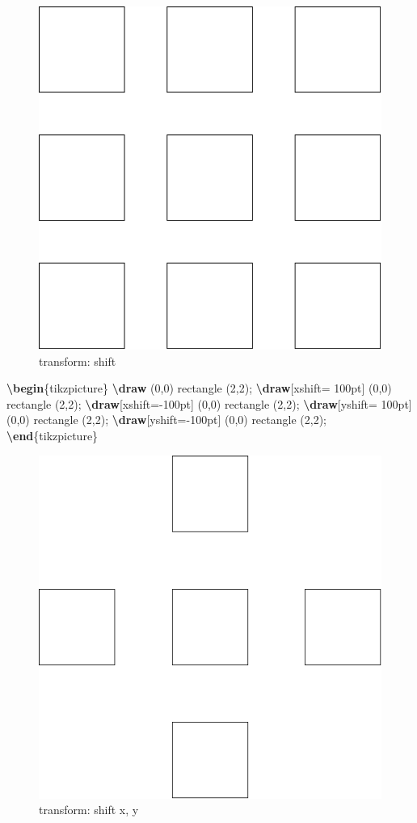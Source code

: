 \documentclass[
]{book}
\newenvironment{Shaded}{\begin{snugshade}}{\end{snugshade}}
\newcommand{\ExtensionTok}[1]{#1}
\newcommand{\FunctionTok}[1]{\textcolor[rgb]{0.13,0.29,0.53}{\textbf{#1}}}
\newcommand{\KeywordTok}[1]{\textcolor[rgb]{0.13,0.29,0.53}{\textbf{#1}}}
\newcommand{\NormalTok}[1]{#1}
\theoremstyle{definition}
\theoremstyle{definition}
\theoremstyle{definition}
\theoremstyle{definition}
\theoremstyle{remark}
\begin{document}
\begin{figure}
\includegraphics[width=0.75\linewidth]{202401311000-TikZ_files/figure-latex/unnamed-chunk-43-1} \caption{transform: shift}\label{fig:unnamed-chunk-43}
\end{figure}

\begin{Shaded}
\begin{Highlighting}[]
\KeywordTok{\textbackslash{}begin}\NormalTok{\{}\ExtensionTok{tikzpicture}\NormalTok{\}}
  \FunctionTok{\textbackslash{}draw}\NormalTok{ (0,0) rectangle (2,2);}
  \FunctionTok{\textbackslash{}draw}\NormalTok{[xshift= 100pt] (0,0) rectangle (2,2);}
  \FunctionTok{\textbackslash{}draw}\NormalTok{[xshift={-}100pt] (0,0) rectangle (2,2);}
  \FunctionTok{\textbackslash{}draw}\NormalTok{[yshift= 100pt] (0,0) rectangle (2,2);}
  \FunctionTok{\textbackslash{}draw}\NormalTok{[yshift={-}100pt] (0,0) rectangle (2,2);}
\KeywordTok{\textbackslash{}end}\NormalTok{\{}\ExtensionTok{tikzpicture}\NormalTok{\}}
\end{Highlighting}
\end{Shaded}

\begin{figure}
\includegraphics[width=0.75\linewidth]{202401311000-TikZ_files/figure-latex/unnamed-chunk-45-1} \caption{transform: shift x, y}\label{fig:unnamed-chunk-45}
\end{figure}
\end{document}
